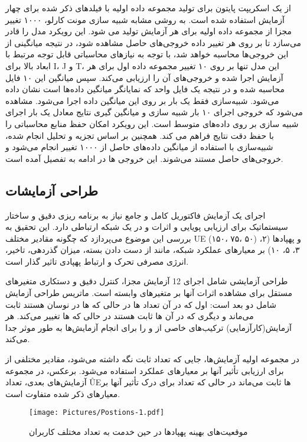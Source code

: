 از یک اسکریپت پایتون برای تولید مجموعه داده اولیه با فیلدهای ذکر شده برای چهار آزمایش استفاده شده است. به روشی مشابه شبیه سازی مونت کارلو، ۱۰۰۰ تغییر مجزا از مجموعه داده اولیه برای هر آزمایش تولید می شود. این رویکرد مدل را قادر می‌سازد تا بر روی هر تغییر داده خروجی‌های حاصل مشاهده شود، در نتیجه میانگینی از این خروجی‌ها محاسبه خواهد شد، با توجه به نیازهای محاسباتی قابل توجه مرتبط با ابعاد بالا برای I، J و T، این مدل تنها بر روی ۱۰ تغییر مجموعه داده اول برای هر آزمایش اجرا  شده و خروجی‌های آن‌ را ارزیابی می‌کند. سپس میانگین این ۱۰ فایل محاسبه شده و در نتیجه یک فایل واحد که نمایانگر میانگین‌ داده‌ها است نشان داده می‌شود.  شبیه‌سازی فقط یک بار بر روی این میانگین داده اجرا می‌شود. مشاهده می‌شود که خروجی اجرای ۱۰ بار شبیه سازی و میانگین گیری نتایج معادل یک بار اجرای شبیه سازی بر روی داده‌های متوسط ​​است. این رویکرد امکان حفظ منابع محاسباتی را با حفظ دقت نتایج فراهم می کند. همچنین بر اساس تجزیه و تحلیل انجام شده، شبیه‌سازی با استفاده از میانگین داده‌های حاصل از ۱۰۰۰ تغییر انجام می‌شود و خروجی‌های حاصل مستند می‌شوند. این خروجی ها در ادامه به تفصیل آمده است.


\subsection{طراحی آزمایشات}
اجرای یک آزمایش فاکتوریل کامل و جامع نیاز به برنامه ریزی دقیق و ساختار سیستماتیک برای ارزیابی پویایی و اثرات   و  در یک شبکه ارتباطی دارد. این تحقیق به بررسی این موضوع می‌پردازد که چگونه مقادیر مختلف UE (۱۵۰، ۷۵، ۵۰) و پهپادها (۲، ۳، ۵، ۱۰) بر معیارهای عملکرد شبکه، مانند از دست دادن بسته، میزان گذردهی، تاخیر، انرژی مصرفی تحرک و ارتباط پهپادی تاثیر گذار است.

طراحی آزمایشی شامل اجرای 12 آزمایش مجزا، کنترل دقیق و دستکاری متغیرهای مستقل برای مشاهده اثرات آنها بر متغیرهای وابسته است. ماتریس طراحی آزمایش شامل دو بعد است: اول که در آن تعداد  ها در حالی که ها در نوسان هستند ثابت می‌ماند و دیگری که در آن ها ثابت هستند در حالی که ها تغییر می‌کند. هر آزمایش(کارآزمایی) ترکیب‌های خاصی از  و  را برای انجام آزمایش‌ها به طور موثر جدا می‌کند.

در مجموعه اولیه آزمایش‌ها، جایی که تعداد  ثابت نگه داشته می‌شود، مقادیر مختلفی از  برای ارزیابی تأثیر آنها بر معیارهای عملکرد استفاده می‌شود. برعکس، در مجموعه آزمایش‌های بعدی، تعداد \r{UE‌}ها ثابت می‌ماند در حالی که تعداد  برای درک تأثیر آنها بر معیارهای ذکر شده متفاوت است.
\begin{figure}%
	\centering
	\texttt{[image: Pictures/Postions-1.pdf]}
	\caption{موقعیت‌های بهینه پهپادها در حین خدمت به تعداد مختلف کاربران}
	\label{fig:PostionsPlots}
\end{figure}

